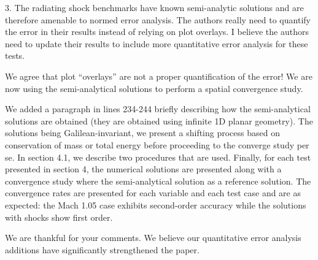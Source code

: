 \documentclass{article}
\begin{document}
{\color{blue}
3. 
The radiating shock benchmarks have known semi-analytic solutions and are therefore amenable to normed error analysis. The authors really need to quantify the error in their results instead of relying on plot overlays. I believe the authors need to update their results to include more quantitative error analysis for these tests.
\\}

We agree that plot "`overlays"' are not a proper quantification of the error! We are now using the semi-analytical solutions to perform a spatial convergence study.

We added a paragraph in lines 234-244 briefly describing how the semi-analytical solutions are obtained
(they are obtained using infinite 1D planar geometry). The solutions being Galilean-invariant, we present a shifting
process based on conservation of mass or total energy before proceeding to the converge study per se. 
In section 4.1, we describe two procedures that are used. Finally, for each test presented in section 4, the numerical solutions are presented along with a convergence study where the semi-analytical solution as a reference solution. 
The convergence rates are presented for each variable and each test case and are as expected: the Mach 1.05 case exhibits second-order accuracy while the solutions with shocks show first order. 

We are thankful for your comments. We believe our quantitative error analysis additions have significantly strengthened the paper. 

\bigskip
\end{document}
